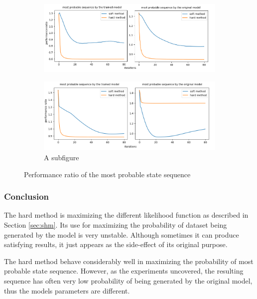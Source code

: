\documentclass[thesis=M,english]{FITthesis}[2012/10/20]
\begin{document}
\begin{figure}
\centering
\begin{subfigure}{1.1\textwidth}
  \centering
  \includegraphics[width=1\linewidth]{img/ex4/hard_good.png}
  \caption{}
  \label{fig:vit_good}
\end{subfigure}
\begin{subfigure}{1.1\textwidth}
  \centering
  \includegraphics[width=1\linewidth]{img/ex4/hard_bad.png}
  \caption{A subfigure}
  \label{fig:vit_bad}
\end{subfigure}
\caption{Performance ratio of the most probable state sequence}
\label{fig:vit_all}
\end{figure}

\subsubsection*{ Conclusion }
The hard method is maximizing the different likelihood function as described in Section \ref{sec:shm}. Its use for maximizing the probability of dataset being generated by the model is very unstable. Although sometimes it can produce satisfying results, it just appears as the side-effect of its original purpose.

The hard method behave considerably well in maximizing the probability of most probable state sequence. However, as the experiments uncovered, the resulting sequence has often very low probability of being generated by the original model, thus the models parameters are different.    
\end{document}
